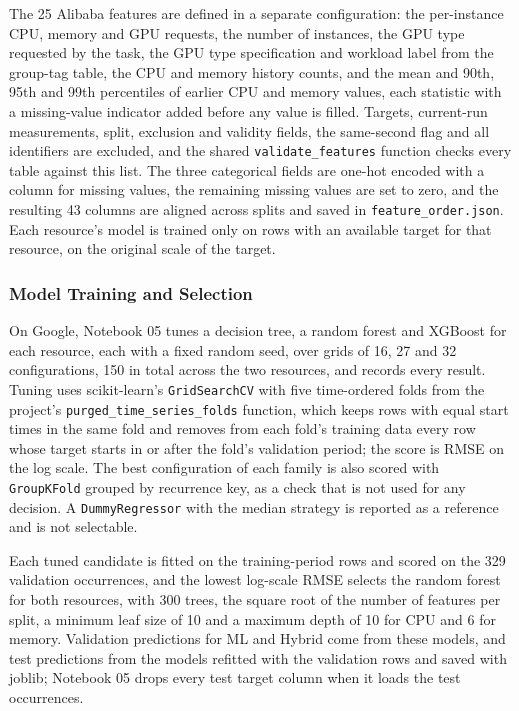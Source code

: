 \documentclass{IEEEtran}
\begin{document}
The 25 Alibaba features are defined in a separate configuration: the per-instance CPU, memory and GPU requests, the number of instances, the GPU type requested by the task, the GPU type specification and workload label from the group-tag table, the CPU and memory history counts, and the mean and 90th, 95th and 99th percentiles of earlier CPU and memory values, each statistic with a missing-value indicator added before any value is filled. Targets, current-run measurements, split, exclusion and validity fields, the same-second flag and all identifiers are excluded, and the shared \texttt{validate\_features} function checks every table against this list. The three categorical fields are one-hot encoded with a column for missing values, the remaining missing values are set to zero, and the resulting 43 columns are aligned across splits and saved in \texttt{feature\_order.json}. Each resource's model is trained only on rows with an available target for that resource, on the original scale of the target.

\subsubsection{Model Training and Selection}\label{sec:5.3.2}

On Google, Notebook 05 tunes a decision tree, a random forest and XGBoost for each resource, each with a fixed random seed, over grids of 16, 27 and 32 configurations, 150 in total across the two resources, and records every result. Tuning uses scikit-learn's \texttt{GridSearchCV} with five time-ordered folds from the project's \texttt{purged\_time\_series\_folds} function, which keeps rows with equal start times in the same fold and removes from each fold's training data every row whose target starts in or after the fold's validation period; the score is RMSE on the log scale. The best configuration of each family is also scored with \texttt{GroupKFold} grouped by recurrence key, as a check that is not used for any decision. A \texttt{DummyRegressor} with the median strategy is reported as a reference and is not selectable.

Each tuned candidate is fitted on the training-period rows and scored on the 329 validation occurrences, and the lowest log-scale RMSE selects the random forest for both resources, with 300 trees, the square root of the number of features per split, a minimum leaf size of 10 and a maximum depth of 10 for CPU and 6 for memory. Validation predictions for ML and Hybrid come from these models, and test predictions from the models refitted with the validation rows and saved with joblib; Notebook 05 drops every test target column when it loads the test occurrences.
\end{document}
